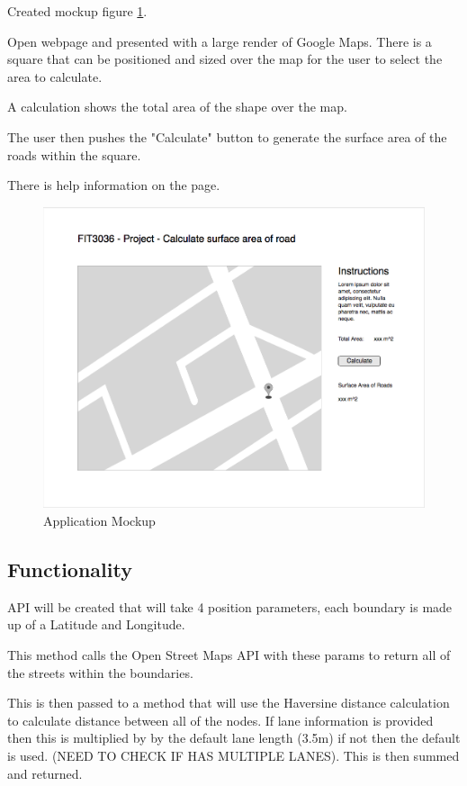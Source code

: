 \documentclass[a4paper,11pt]{article}
\begin{document}

Created mockup figure \ref{fig:mockup}. %

Open webpage and presented with a large render of Google Maps. There is a square that can be positioned and sized over the map for the user to select the area to calculate.

A calculation shows the total area of the shape over the map.

The user then pushes the "Calculate" button to generate the surface area of the roads within the square.

There is help information on the page.

\begin{figure}[H]
  \includegraphics[width=\textwidth]{UI-mockup}
  \caption{Application Mockup}
  \label{fig:mockup}
\end{figure}

\subsection{Functionality}


API will be created that will take 4 position parameters, each boundary is made up of a Latitude and Longitude.

This method calls the Open Street Maps API with these params to return all of the streets within the boundaries.

This is then passed to a method that will use the Haversine distance calculation to calculate distance between all of the nodes. If lane information is provided then this is multiplied by by the default lane length (3.5m) if not then the default is used. (NEED TO CHECK IF HAS MULTIPLE LANES). This is then summed and returned.
\end{document}
